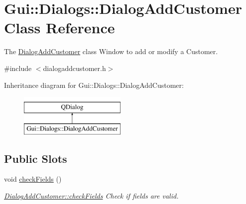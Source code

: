 \hypertarget{classGui_1_1Dialogs_1_1DialogAddCustomer}{}\section{Gui\+:\+:Dialogs\+:\+:Dialog\+Add\+Customer Class Reference}
\label{classGui_1_1Dialogs_1_1DialogAddCustomer}


The \hyperlink{classGui_1_1Dialogs_1_1DialogAddCustomer}{Dialog\+Add\+Customer} class Window to add or modify a Customer.  




{\ttfamily \#include $<$dialogaddcustomer.\+h$>$}

Inheritance diagram for Gui\+:\+:Dialogs\+:\+:Dialog\+Add\+Customer\+:\begin{figure}[H]
\begin{center}
\leavevmode
\includegraphics[height=2.000000cm]{d2/d50/classGui_1_1Dialogs_1_1DialogAddCustomer}
\end{center}
\end{figure}
\subsection*{Public Slots}
\begin{DoxyCompactItemize}
\item 
\hypertarget{classGui_1_1Dialogs_1_1DialogAddCustomer_ab1c4fdf53139a3aac7243c42881d2af1}{}void \hyperlink{classGui_1_1Dialogs_1_1DialogAddCustomer_ab1c4fdf53139a3aac7243c42881d2af1}{check\+Fields} ()\label{classGui_1_1Dialogs_1_1DialogAddCustomer_ab1c4fdf53139a3aac7243c42881d2af1}

\begin{DoxyCompactList}\small\item\em \hyperlink{classGui_1_1Dialogs_1_1DialogAddCustomer_ab1c4fdf53139a3aac7243c42881d2af1}{Dialog\+Add\+Customer\+::check\+Fields} Check if fields are valid. \end{DoxyCompactList}\end{DoxyCompactItemize}
